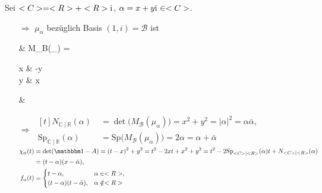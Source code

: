 \begin{example}
	Sei $<C> = <R> + <R>\mathrm{i}\mkern1mu$, $\alpha = x+y\mathrm{i}\mkern1mu \in <C>$.
	\begin{itemize}[topsep=-6pt]
		\item[$\Rightarrow$] $\mu_\alpha$ bezüglich Basis $(1,i) = \mathcal B$ ist \begin{flalign*}
			\quad & M_{\mathcal B}(\mu_\alpha) = \begin{pmatrix}
				x & -y \\ y & x
			\end{pmatrix} &
		\end{flalign*}
		\item[$\Rightarrow$] $\begin{aligned}[t]N_{\mathbb C\mid\mathbb R} (\alpha)\; &= \det\big(M_{\mathcal B}(\mu_\alpha)\big) = x^2 + y^2 = \vert \alpha\vert^2 = \alpha\bar\alpha,\\
		\mathrm{Sp}_{\mathbb C\mid\mathbb R}(\alpha) &= \mathrm{Sp}\big( M_{\mathcal B}(\mu_\alpha)\big) = 2\alpha = \alpha + \bar\alpha\end{aligned}$\\[4\lineskip]
		$\begin{aligned}[t]\chi_\alpha(t) &= \det(\mathbbm 1 - A) = (t - x)^2 + y^2 = t^2- 2xt + x^2 + y^2 = t^2 - 2 \mathrm{Sp}_{\mathbb C\mid\mathbb R}(\alpha)t + N_{\mathbb C\mid\mathbb R}(\alpha)\\
		& = (t - \alpha)(x - \bar\alpha),\\
		\displaystyle f_\alpha(t) &= \begin{cases}
			t - \alpha, & \alpha\in\mathbb R,\\ (t-\alpha)(t-\bar\alpha), & \alpha\notin\mathbb R
		\end{cases}\end{aligned}$
	\end{itemize}
\end{example}

